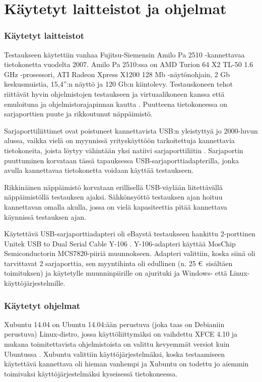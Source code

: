 \section{Käytetyt laitteistot ja ohjelmat}
\subsubsection{Käytetyt laitteistot}
Testaukseen käytettiin vanhaa Fujitsu-Siemensin Amilo Pa 2510 -kannettavaa tietokonetta vuodelta 2007. Amilo Pa 2510:ssa on AMD Turion 64 X2 TL-50 1.6 GHz -prosessori, ATI Radeon Xpress X1200 128 Mb -näytönohjain, 2 Gb keskusmuistia, 15,4'':n näyttö ja 120 Gb:n kiintolevy. Testauskoneen tehot riittävät hyvin ohjelmistojen testaukseen ja virtuaalikoneen kanssa että emuloituna ja ohjelmistorajapinnan kautta \cite{fs_amilo:review}. Puutteena tietokoneessa on sarjaporttien puute ja rikkoutunut näppäimistö.

Sarjaporttiliittimet ovat poistuneet kannettavista USB:n yleistyttyä jo 2000-luvun alussa, vaikka vielä on myynnissä yrityskäyttöön tarkoitettuja kannettavia tietokoneita, joista löytyy vähintään yksi natiivi sarjaporttiliitin \cite{hp:laptop}. Sarjaportin puuttuminen korvataan tässä tapauksessa USB-sarjaporttiadapterilla, jonka avulla kannettavaa tietokonetta voidaan käyttää testaukseen.

Rikkinäinen näppäimistö korvataan erillisellä USB-väylään liitettävällä näppäimistöllä testauksen ajaksi. Sähkönsyöttö testauksen ajan hoituu kannettavan omalla akulla, jossa on vielä kapasiteettia pitää kannettava käynnissä testauksen ajan.

Käytettävä USB-sarjaporttiadapteri oli eBaystä testaukseen hankittu 2-porttinen Unitek USB to Dual Serial Cable Y-106 \cite{serial:unitek}. Y-106-adapteri käyttää MosChip Semiconductorin MCS7820-piiriä muunnokseen. Adapteri valittiin, koska siinä oli tarvittavat 2 sarjaporttia, sen myyntihinta oli edullinen (n. 25 € sisältäen toimituksen) ja käytetylle muunninpiirille on ajurituki ja Windows- että Linux-käyttöjärjestelmille.


\subsubsection{Käytetyt ohjelmat}
Xubuntu 14.04 on Ubuntu 14.04:ään perustuva (joka taas on Debianiin perustuva) Linux-distro, jossa käyttöliittymäksi on vaihdettu XFCE 4.10 ja mukana toimitettavista ohjelmistoista on valittu kevyemmät versiot kuin Ubuntussa \cite{xubuntu:about}. Xubuntu valittiin käyttöjärjestelmäksi, koska testaamiseen käytettävä kannettava oli hieman vanhempi ja Xubuntu on todettu jo aiemmin toimivaksi käyttöjärjestelmäksi kyseisessä tietokoneessa.

